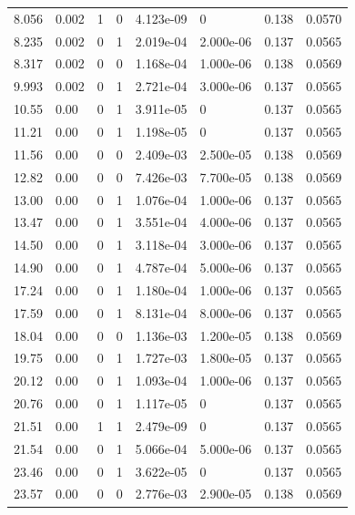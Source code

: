 \documentclass[preview]{standalone}
\begin{document}
{{\begin{tabular}{L{1.2cm}C{1.2cm} C{0.3cm}C{0.5cm} C{1.4cm}C{1.4cm} C{1.4cm}C{1.4cm}}
  8.056  &  0.002  & 1     &  0 &  4.123e-09  & 0  & 0.138 &  0.0570   \\ 
  8.235  &  0.002  & 0     &  1 &  2.019e-04  & 2.000e-06  & 0.137 &  0.0565   \\ 
  8.317  &  0.002  & 0     &  0 &  1.168e-04  & 1.000e-06  & 0.138 &  0.0569   \\ 
  9.993  &  0.002  & 0     &  1 &  2.721e-04  & 3.000e-06  & 0.137 &  0.0565   \\ 
  10.55  &  0.00  & 0     &  1 &  3.911e-05  & 0  & 0.137 &  0.0565   \\ 
  11.21  &  0.00  & 0     &  1 &  1.198e-05  & 0  & 0.137 &  0.0565   \\ 
  11.56  &  0.00  & 0     &  0 &  2.409e-03  & 2.500e-05  & 0.138 &  0.0569   \\ 
  12.82  &  0.00  & 0     &  0 &  7.426e-03  & 7.700e-05  & 0.138 &  0.0569   \\ 
  13.00  &  0.00  & 0     &  1 &  1.076e-04  & 1.000e-06  & 0.137 &  0.0565   \\ 
  13.47  &  0.00  & 0     &  1 &  3.551e-04  & 4.000e-06  & 0.137 &  0.0565   \\ 
  14.50  &  0.00  & 0     &  1 &  3.118e-04  & 3.000e-06  & 0.137 &  0.0565   \\ 
  14.90  &  0.00  & 0     &  1 &  4.787e-04  & 5.000e-06  & 0.137 &  0.0565   \\ 
  17.24  &  0.00  & 0     &  1 &  1.180e-04  & 1.000e-06  & 0.137 &  0.0565   \\ 
  17.59  &  0.00  & 0     &  1 &  8.131e-04  & 8.000e-06  & 0.137 &  0.0565   \\ 
  18.04  &  0.00  & 0     &  0 &  1.136e-03  & 1.200e-05  & 0.138 &  0.0569   \\ 
  19.75  &  0.00  & 0     &  1 &  1.727e-03  & 1.800e-05  & 0.137 &  0.0565   \\ 
  20.12  &  0.00  & 0     &  1 &  1.093e-04  & 1.000e-06  & 0.137 &  0.0565   \\ 
  20.76  &  0.00  & 0     &  1 &  1.117e-05  & 0  & 0.137 &  0.0565   \\ 
  21.51  &  0.00  & 1     &  1 &  2.479e-09  & 0  & 0.137 &  0.0565   \\ 
  21.54  &  0.00  & 0     &  1 &  5.066e-04  & 5.000e-06  & 0.137 &  0.0565   \\ 
  23.46  &  0.00  & 0     &  1 &  3.622e-05  & 0  & 0.137 &  0.0565   \\ 
  23.57  &  0.00  & 0     &  0 &  2.776e-03  & 2.900e-05  & 0.138 &  0.0569   \\ 

\end{tabular}}}
\end{document}
